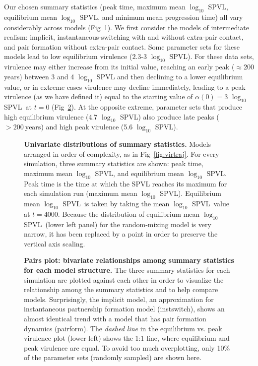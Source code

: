 \documentclass[10pt,letterpaper]{article}
\renewcommand{\figurename}{Fig}
\newcommand{\Lspvl}{$\log_{10}$ SPVL}
\begin{document}
Our chosen summary statistics (peak time, maximum mean \Lspvl, equilibrium mean \Lspvl, and minimum mean progression time) 
all vary considerably across models
(\figurename~\ref{fig:unidist}).
We first consider the models of intermediate realism: implicit,
instantaneous-switching with and without extra-pair contact, and
pair formation without extra-pair contact. 
Some parameter
sets for these models lead to low equilibrium virulence ($2.3$-$3$ \Lspvl).
For these data sets, virulence may either increase from its initial value,
reaching an early peak ($\approx 200$ years) between 3 and 4 \Lspvl
and then declining to a lower equilibrium value, or in extreme cases
virulence may decline immediately, leading to a peak virulence (as we have
defined it) equal to the starting value of $\alpha(0)=3$ \Lspvl\ at $t=0$
(\figurename~\ref{fig:pairplot}).
At the opposite extreme, parameter sets that produce high equilibrium virulence (4.7 \Lspvl)
also produce late peaks ($> 200~\text{years}$) and
high peak virulence (5.6 \Lspvl).

\begin{figure}[!ht]
\caption{{\bf Univariate distributions of summary statistics.}
Models arranged in order of complexity, as in \figurename~\ref{fig:virtraj}.
For every simulation, three summary statistics are shown: peak time, maximum mean \Lspvl, and equilibrium mean \Lspvl.
Peak time is the time at which the SPVL reaches its maximum for each simulation run (maximum mean \Lspvl).
Equilibrium mean \Lspvl\ is taken by taking the mean \Lspvl\ value at $t = 4000$.
Because the distribution of equilibrium mean \Lspvl\
(lower left panel) for the random-mixing model is very narrow, it
has been replaced by a point in order to preserve the vertical axis scaling.}
\label{fig:unidist}
\end{figure}

\begin{figure}[!ht]
\caption{{\bf Pairs plot: bivariate relationships among summary statistics for each model structure.}
The three summary statistics for each simulation are plotted against each other in order to visualize the relationship among the summary statistics and to help compare models.
Surprisingly, the implicit model, an approximation for instantaneous partnership formation model (instswitch), shows an almost identical trend with a model that has pair formation dynamics (pairform).
The \emph{dashed line} in the equilibrium vs. peak virulence plot (lower left) shows the 1:1 line, where equilibrium and peak virulence are equal.
To avoid too much overplotting, only 10\% of the parameter sets
(randomly sampled) are shown here.}
\label{fig:pairplot}
\end{figure}
\end{document}

